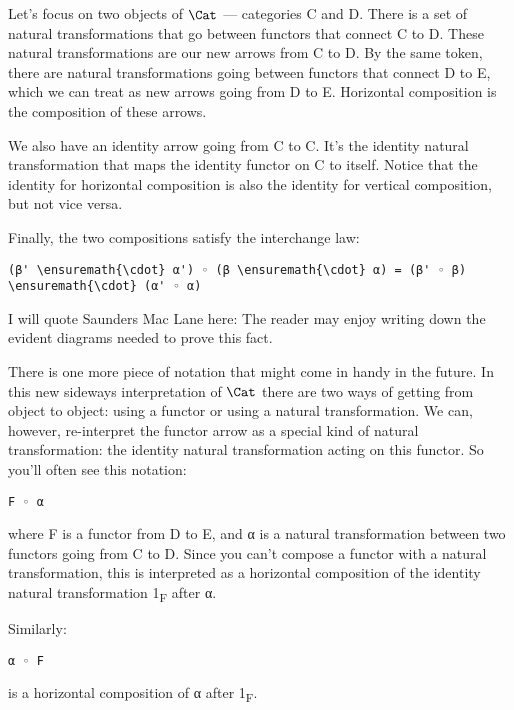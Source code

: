 \noindent
Let's focus on two objects of $\Cat$ --- categories C and D. There
is a set of natural transformations that go between functors that
connect C to D. These natural transformations are our new arrows from C
to D. By the same token, there are natural transformations going between
functors that connect D to E, which we can treat as new arrows going
from D to E. Horizontal composition is the composition of these arrows.

We also have an identity arrow going from C to C. It's the identity
natural transformation that maps the identity functor on C to itself.
Notice that the identity for horizontal composition is also the identity
for vertical composition, but not vice versa.

Finally, the two compositions satisfy the interchange law:

\begin{Verbatim}[commandchars=\\\{\}]
(β' \ensuremath{\cdot} α') ◦ (β \ensuremath{\cdot} α) = (β' ◦ β) \ensuremath{\cdot} (α' ◦ α)
\end{Verbatim}

I will quote Saunders Mac Lane here: The reader may enjoy writing down
the evident diagrams needed to prove this fact.

There is one more piece of notation that might come in handy in the
future. In this new sideways interpretation of $\Cat$ there are
two ways of getting from object to object: using a functor or using a
natural transformation. We can, however, re-interpret the functor arrow
as a special kind of natural transformation: the identity natural
transformation acting on this functor. So you'll often see this
notation:

\begin{Verbatim}[commandchars=\\\{\}]
F ◦ α
\end{Verbatim}
where F is a functor from D to E, and α is a natural transformation
between two functors going from C to D. Since you can't compose a
functor with a natural transformation, this is interpreted as a
horizontal composition of the identity natural transformation
1\textsubscript{F} after α.

Similarly:

\begin{Verbatim}[commandchars=\\\{\}]
α ◦ F
\end{Verbatim}
is a horizontal composition of α after 1\textsubscript{F}.

